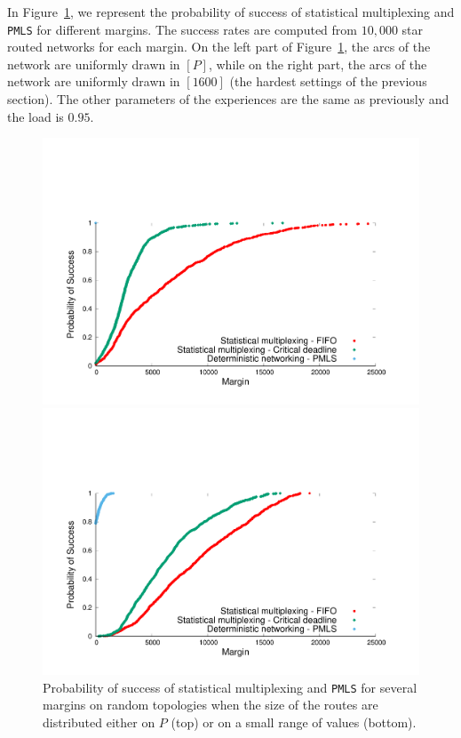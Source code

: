 \documentclass[a4paper,10pt]{journal}
\newcommand\PMLS{\texttt{PMLS}\xspace}
\begin{document}
     In Figure~\ref{fig:sto}, we represent the probability of success of statistical multiplexing and \PMLS for different margins. The success rates are computed from $10,000$ star routed networks for each margin. On the left part of Figure~\ref{fig:sto}, the arcs of the network are uniformly drawn in $[P]$, while on the right part, the arcs of the network are uniformly drawn in $[1600]$ (the hardest settings of the previous section). The other parameters of the experiences are the same as previously and the load is $0.95$. 
     
    \begin{figure}


       \begin{center}
      \includegraphics[width = 0.7\linewidth]{stochasticdistrib.pdf}

     \includegraphics[width = 0.7\linewidth]{stochastic.pdf}

       \end{center}
      
      
  \caption{Probability of success of statistical multiplexing and \PMLS for several margins on random topologies when the size of the routes are distributed either on $P$ (top) or on a small range of values (bottom).}
      \label{fig:sto} 
      \end{figure}
\end{document}
